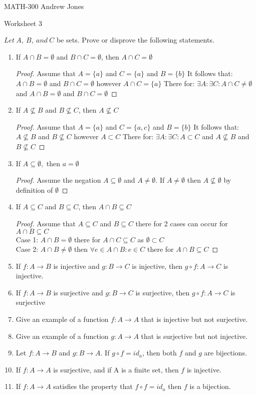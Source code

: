 \documentclass{article}
\begin{document}
  MATH-300 \hfill Andrew Jones
  \begin{center}
  {\huge Worksheet 3}
  \end{center}
  $Let\ A,\ B,\ and\ C$ be sets. Prove or disprove the following statements. \\
  \begin{enumerate}
  \item If $A\cap B = \emptyset$ and $B\cap C = \emptyset$, then $A\cap C = \emptyset$
    \begin{proof}
      Assume that $A = \{a\}$ and $C = \{a\}$ and $B = \{b\}$ 
      It follows that: $A\cap B = \emptyset$ and $B\cap C = \emptyset$ however $A\cap C = \{a\}$
      There for: $\exists A: \exists C: A\cap C \neq \emptyset$ and $A\cap B = \emptyset$ and $B\cap C = \emptyset$  
    \end{proof}
  \item If $A\not\subseteq B$ and $B\not\subseteq C$, then $A\not\subseteq C$ 
    \begin{proof}
      Assume that $A = \{a\}$ and $C = \{a, c\}$ and $B = \{b\}$ 
      It follows that: $A\not\subseteq B$ and $B\not\subseteq C$ however $A\subset C$
      There for: $\exists A: \exists C: A\subset C$ and $A\not\subseteq B$ and $B\not\subseteq C$  
    \end{proof}
  \item If $A\subseteq \emptyset,$ then $a= \emptyset$ 
    \begin{proof}
      Assume the negation $A\subseteq \emptyset$ and $A \neq \emptyset$.
      If $A \neq \emptyset$ then $A\not\subseteq \emptyset$ by definition of $\emptyset$ 
    \end{proof}
  \item If $A\subseteq C$ and $B\subseteq C$, then $A\cap B\subseteq C$
    \begin{proof}
     Assume that $A\subseteq C$ and $B\subseteq C$ there for 2 cases can occur for $A\cap B\subseteq C$ \\
     Case 1: $A\cap B = \emptyset$ there for $A\cap C\subseteq C$ as $\emptyset \subset C$ \\
     Case 2: $A\cap B \neq \emptyset$ then $\forall e\in A\cap B: e\in C$ there for $A\cap B \subseteq C$
    \end{proof}
  \item If $f : A\to B$ is injective and $g : B\to C$ is injective, then $g \circ f : A\to C$ is injective. 
  \item If $f : A\to B$ is surjective and $g : B\to C$ is surjective, then $g \circ f : A\to C$ is surjective 
  \item Give an example of a function $f : A\to A$ that is injective but not surjective. 
  \item Give an example of a function $g : A\to A$ that is surjective but not injective. 
  \item Let $f : A\to B$ and $g : B\to A$. If $g \circ f = id_{a}$, then both $f$ and $g$ are bijections.
  \item If $f : A\to A$ is surjective, and if A is a finite set, then $f$ is injective.
  \item If $f : A\to A$ satisfies the property that $f \circ f = id_{a}$ then $f$ is a bijection.
  \end{enumerate}
\end{document}
